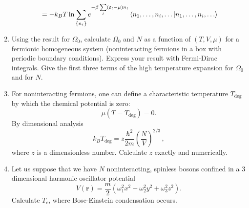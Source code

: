 \documentclass[11pt, a4paper]{article}
\begin{document}
\begin{enumerate}
\begin{align*}
        &= -k_BT \ln \sum\limits_{\{n_i\}} e^{-\beta \sum\limits_l(\varepsilon_l-\mu) n_l} \braket{n_1, \dots, n_i, \dots | n_1, \dots, n_i, \dots }\\
    \end{align*}
    \item Using the result for $\Omega_0$, calculate $\Omega_0$ and $N$ as a function of $(T,V,\mu)$
    for a fermionic homogeneous system (noninteracting fermions in a box with periodic boundary
    conditions). Express your result with Fermi-Dirac integrals. Give the first three terms of the
    high temperature expansion for $\Omega_0$ and for $N$.
    
    \item For noninteracting fermions, one can define a characteristic temperature $T_{\textrm{deg}}$
    by which the chemical potential is zero:
    \begin{equation*}
        \mu(T=T_{\textrm{deg}}) = 0.
    \end{equation*}
    By dimensional analysis
    \begin{equation*}
        k_BT_{\textrm{deg}} = z \frac{\hbar^2}{2m}\left(\frac{N}{V}\right)^{2/3}\,,
    \end{equation*}
    where $z$ is a dimensionless number. Calculate $z$ exactly and numerically.

    \item Let us suppose that we have $N$ noninteracting, spinless bosons confined in a
    3 dimensional harmonic oscillator potential
    \begin{equation*}
        V(\mathbf{r}) = \frac{m}{2}(\omega_1^2x^2 + \omega_2^2y^2 + \omega_3^2z^2).
    \end{equation*}
    Calculate $T_c$, where Bose-Einstein condensation occurs.
\end{enumerate}
\end{document}
